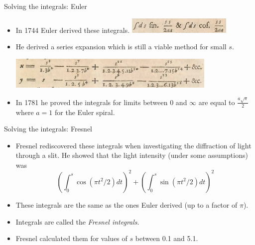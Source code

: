 \documentclass{beamer}
\begin{document}
\begin{frame}{Solving the integrals: Euler}
	\begin{itemize}
		\item In 1744 Euler derived these integrals.
		\includegraphics[width=50mm, scale=0.5]{euler_scripture_1.png}	
		\item He derived a series expansion which is still a viable method for small $s$.
		
		\includegraphics[width=100mm, scale=0.7]{euler_scripture.png}
		
		\item In 1781 he proved the integrals for limits between 0 and $\infty$ are equal to  $\frac{a \sqrt{\pi}}{2}$ where $a=1$ for the Euler spiral.
	\end{itemize}
\end{frame}

\begin{frame}{Solving the integrals: Fresnel}
	\begin{itemize}
		\item Fresnel rediscovered these integrals when investigating the diffraction of light through a slit. He showed that the light intensity (under some assumptions) was 
		\[
		\left( \int_{0}^{s}\cos \left( \pi t^2 / 2 \right) dt \right) ^2 + 
		\left( \int_{0}^{s}\sin \left( \pi t^2 / 2 \right) dt \right) ^2
		\] 
		\item These integrals are the same as the ones Euler derived (up to a factor of $\pi$).
		\item Integrals are called the \emph{Fresnel integrals}.
		\item Fresnel calculated them for values of $s$ between 0.1 and 5.1.
	\end{itemize}
\end{frame}
\end{document}
